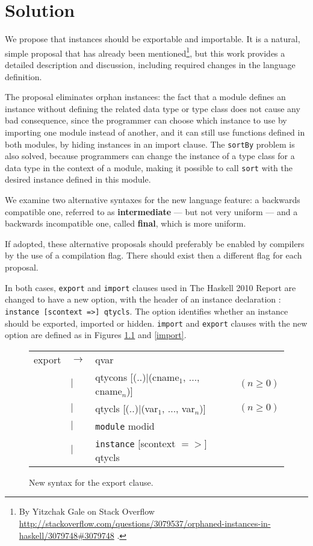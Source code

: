\documentclass[msc]{ppgccufmg}
\begin{document}
\chapter{Solution}
\label{solution}

We propose that instances should be exportable and importable.  It is a natural, simple proposal that has already
been mentioned\footnote{By Yitzchak Gale on Stack Overflow
  \url{http://stackoverflow.com/questions/3079537/orphaned-instances-in-haskell/3079748\#3079748}
  .}, but this work provides a detailed description and discussion,
including required changes in the language definition.

The proposal eliminates orphan
instances: the fact that a module defines an instance without
defining the related data type or type class does not cause any bad
consequence, since the programmer can choose which instance to use
by importing one module instead of another, and it can still use
functions defined in both modules, by hiding instances in an import
clause.  The \texttt{sortBy} problem is also solved, because
programmers can change the instance of a type class for a data type in
the context of a module, making it possible to call \texttt{sort} with
the desired instance defined in this module.

We examine two alternative syntaxes for the new language feature: a
backwards compatible one, referred to as \textbf{intermediate} --- but
not very uniform --- and a backwards incompatible one, called
\textbf{final}, which is more uniform.

If adopted, these alternative proposals should
preferably be enabled by compilers by the use of a compilation flag.  There
should exist then a different flag for each proposal.

In both cases, \texttt{export} and \texttt{import} clauses used in
The Haskell 2010 Report \citep[sections 5.2 and 5.3]{report} are
changed to have a new option, with the header of
an instance declaration \citep[section~4.3.2]{report}: \texttt{instance
  [scontext =>] qtycls}.  The option identifies whether an instance should be
exported, imported or hidden.  \texttt{import} and \texttt{export} clauses with the new option are defined as in
Figures \ref{export} and \ref{import}.

\begin{figure}
\caption{New syntax for the export clause.\label{export}}
\begin{tabular}{|l l l l|}
\hline
export & $\to$ & qvar &\\
& $|$ & qtycons [(..)$|$(cname$_1$, ..., cname$_n$)] & $(n \geq 0)$\\
& $|$ & qtycls [(..)$|$(var$_1$, ..., var$_n$)] & $(n \geq 0)$\\
& $|$ & \texttt{module} modid &\\
& $|$ & \texttt{instance} [scontext $=>$] qtycls &\\
\hline
\end{tabular}
\end{figure}
\end{document}

